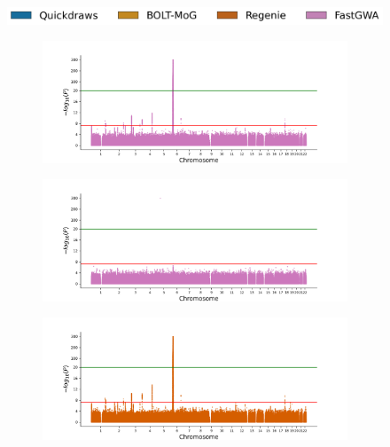 \begin{figure}[h!]
    \centering
    \includegraphics[scale=0.425]{figures/manhattan_bin/legend.png}
    \begin{subfigure}{.5\textwidth}
    \includegraphics[width=\textwidth]{figures/manhattan_bin/fastgwa_400k17.png}
    \end{subfigure}%
    \begin{subfigure}{.5\textwidth}
    \includegraphics[width=\textwidth]{figures/manhattan_bin/fastgwa_400k22.png}
    \end{subfigure}
    \begin{subfigure}{.5\textwidth}
    \includegraphics[width=\textwidth]{figures/manhattan_bin/regenie_400kCoeliac_disease.png}
    \end{subfigure}%
    \begin{subfigure}{.5\textwidth}

\end{subfigure}
\end{figure}
